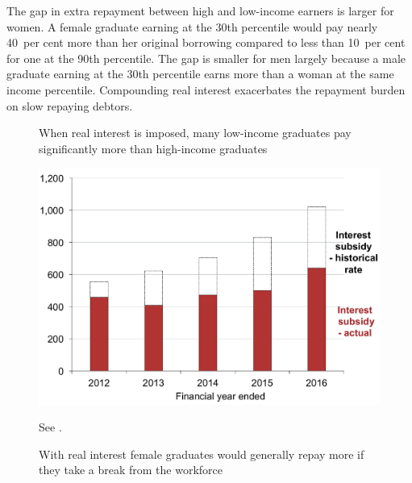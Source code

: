 \documentclass[embargoed]{grattan}
\begin{document}
The gap in extra repayment between high and low-income earners is larger for women.
A female graduate earning at the 30{th} percentile would pay nearly 40~per cent more than her original borrowing compared to less than 10~per cent for one at the 90th percentile.
The gap is smaller for men largely because a male graduate earning at the 30{th} percentile earns more than a woman at the same income percentile.
Compounding real interest exacerbates the repayment burden on slow repaying debtors.


\begin{figure}
\begin{minipage}[t][\textheight]{\columnwidth}
\vspace{\grattanfptop}
\caption{When real interest is imposed, many low-income graduates pay significantly more than high-income graduates}\label{fig:fig14-when-real-interest-imposed-many-low-income-grads-pay-signif-more-than-high-income-grads}


\includegraphics[page=14]{atlas/Chartpack.pdf}

%
{See .}
\end{minipage}
\hfill 
\begin{minipage}[t][\textheight]{\columnwidth}
\vspace{\grattanfptop}
\caption{With real interest female graduates would generally repay more if they take a break from the workforce}\label{fig:fig15-with-real-interest-female-grads-would-repay-more-if-they-took-break-from-workforce}


\end{minipage}
\end{figure}
\end{document}
